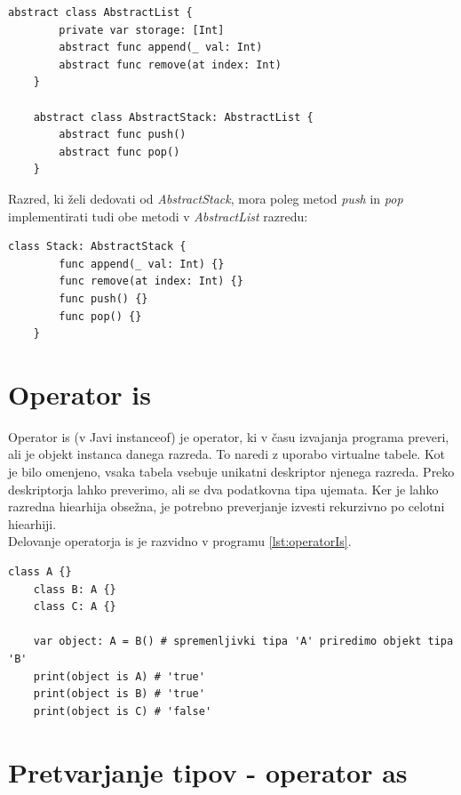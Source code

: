 \documentclass[a4paper, 12p]{book}
\begin{document}
\begin{lstlisting}[caption={}, captionpos=b]
	abstract class AbstractList {
	    private var storage: [Int]
	    abstract func append(_ val: Int)
	    abstract func remove(at index: Int)
	}
	
	abstract class AbstractStack: AbstractList {
	    abstract func push()
	    abstract func pop()
	}
\end{lstlisting}

Razred, ki želi dedovati od \textit{AbstractStack}, mora poleg metod \textit{push} in \textit{pop} implementirati tudi obe metodi v \textit{AbstractList} razredu:

\begin{lstlisting}[caption={}, captionpos=b]
	class Stack: AbstractStack {
	    func append(_ val: Int) {}
	    func remove(at index: Int) {}
	    func push() {}
	    func pop() {}
	}
\end{lstlisting}

\section{Operator {\ttfamily is}}

Operator {\ttfamily is} (v Javi {\ttfamily instanceof}) je operator, ki v času izvajanja programa preveri, ali je objekt instanca danega razreda. To naredi z uporabo virtualne tabele. Kot je bilo omenjeno, vsaka tabela vsebuje unikatni deskriptor njenega razreda. Preko deskriptorja lahko preverimo, ali se dva podatkovna tipa ujemata. Ker je lahko razredna hiearhija obsežna, je potrebno preverjanje izvesti rekurzivno po celotni hiearhiji. \\
\indent Delovanje operatorja {\ttfamily is} je razvidno v programu \ref{lst:operatorIs}.

\begin{lstlisting}[caption={Uporaba operatorja {\ttfamily is}.}, captionpos=b, label={lst:operatorIs}]
	class A {}
	class B: A {}
	class C: A {}
	
	var object: A = B() # spremenljivki tipa 'A' priredimo objekt tipa 'B'
	print(object is A) # 'true'
	print(object is B) # 'true'
	print(object is C) # 'false'
\end{lstlisting}

\section{Pretvarjanje tipov - operator {\ttfamily as}}
\end{document}
